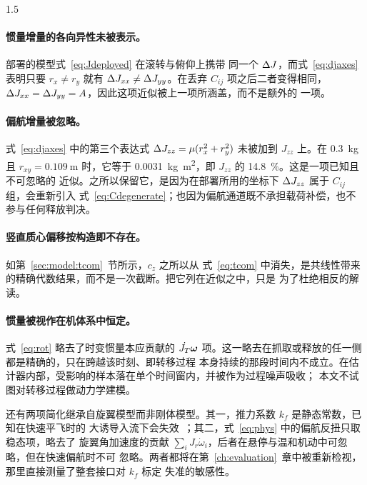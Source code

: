 \begin{spacing}{1.5}
\paragraph{惯量增量的各向异性未被表示。}部署的模型式~\eqref{eq:Jdeployed} 在滚转与俯仰上携带
同一个 $\Delta J$，而式~\eqref{eq:djaxes} 表明只要 $r_x\ne r_y$ 就有 $\Delta J_{xx}\ne\Delta J_{yy}$。在丢弃
$C_{ij}$ 项之后二者变得相同，$\Delta J_{xx}=\Delta J_{yy}=A$，因此这项近似被上一项所涵盖，而不是额外的
一项。

\paragraph{偏航增量被忽略。}式~\eqref{eq:djaxes} 中的第三个表达式 $\Delta J_{zz} = \mu(r_x^2 + r_y^2)$
未被加到 $J_{zz}$ 上。在 \SI{0.3}{\kg} 且 $r_{xy} = \SI{0.109}{\meter}$ 时，它等于
\SI{0.0031}{\kg\meter\squared}，即 $J_{zz}$ 的 \SI{14.8}{\percent}。这是一项已知且不可忽略的
近似。之所以保留它，是因为在部署所用的坐标下 $\Delta J_{zz}$ 属于 $C_{ij}$ 组，会重新引入
式~\eqref{eq:Cdegenerate}；也因为偏航通道既不承担载荷补偿，也不参与任何释放判决。

\paragraph{竖直质心偏移按构造即不存在。}如第~\ref{sec:model:tcom}~节所示，$c_z$ 之所以从
式~\eqref{eq:tcom} 中消失，是共线性带来的精确代数结果，而不是一次截断。把它列在近似之中，只是
为了杜绝相反的解读。

\paragraph{惯量被视作在机体系中恒定。}式~\eqref{eq:rot} 略去了时变惯量本应贡献的
$\dot{J_T}\bm{\omega}$ 项。这一略去在抓取或释放的任一侧都是精确的，只在跨越该时刻、即转移过程
本身持续的那段时间内不成立。在估计器内部，受影响的样本落在单个时间窗内，并被作为过程噪声吸收；
本文不试图对转移过程做动力学建模。

还有两项简化继承自旋翼模型而非刚体模型。其一，推力系数 $k_f$ 是静态常数，已知在快速平飞时的
大诱导入流下会失效~\cite{bangura2012}；其二，式~\eqref{eq:phys} 中的偏航反扭只取稳态项，略去了
旋翼角加速度的贡献 $\sum_i J_r \dot\omega_i$，后者在悬停与温和机动中可忽略，但在快速偏航时不可
忽略。两者都将在第~\ref{ch:evaluation}~章中被重新检视，那里直接测量了整套接口对 $k_f$ 标定
失准的敏感性。

\end{spacing}
\newpage
